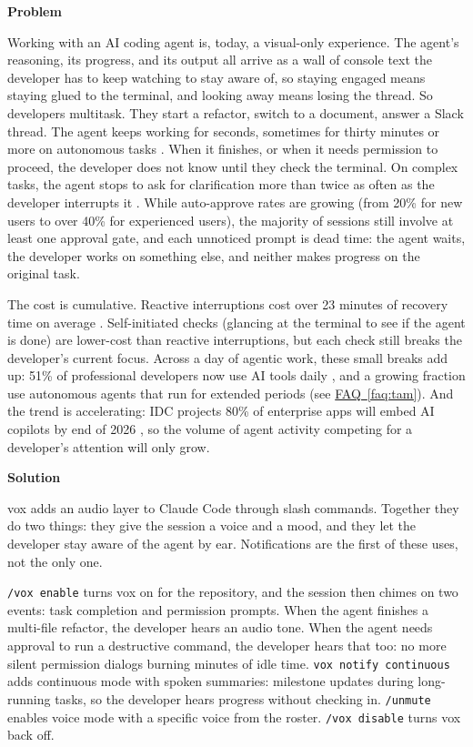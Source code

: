 \documentclass[11pt,letterpaper]{article}
\newcommand{\prsection}[1]{%
  \vspace{1em}%
  {\large\bfseries\color{SectionBlue}#1}%
  \vspace{0.3em}\par%
}
\newcommand{\faqref}[1]{\hyperref[#1]{FAQ~\ref*{#1}}}
\begin{document}
\prsection{Problem}

Working with an AI coding agent is, today, a visual-only experience. The
agent's reasoning, its progress, and its output all arrive as a wall of console
text the developer has to keep watching to stay aware of, so staying engaged
means staying glued to the terminal, and looking away means losing the thread.
So developers multitask. They start a refactor, switch to a document, answer a
Slack thread. The agent keeps working for seconds, sometimes for thirty
minutes or more on autonomous tasks \cite{anthropic2026agentautonomy,anthropic2026longrunnagents}. When it finishes, or when it needs
permission to proceed, the developer does not know until they check the
terminal. On complex tasks, the agent stops to ask for clarification more than
twice as often as the developer interrupts it
\cite{anthropic2026agentautonomy}. While auto-approve rates are growing
(from 20\% for new users to over 40\% for experienced users), the majority
of sessions still involve at least one approval gate, and each unnoticed
prompt is dead time: the agent waits, the developer works on something else,
and neither makes progress on the original task.

The cost is cumulative. Reactive interruptions cost over 23 minutes of
recovery time on average \cite{mark2008interrupted}. Self-initiated checks
(glancing at the terminal to see if the agent is done) are lower-cost
than reactive interruptions, but each check still breaks the developer's
current focus. Across a day of agentic work, these small breaks add up:
51\% of professional developers now use AI tools daily
\cite{stackoverflow2025survey}, and a growing fraction use autonomous agents
that run for extended periods
(see \faqref{faq:tam}). And the trend is accelerating: IDC projects 80\% of
enterprise apps will embed AI copilots by end of 2026
\cite{couriernotificationfatigue2026}, so the volume of agent activity
competing for a developer's attention will only grow.

\prsection{Solution}

vox adds an audio layer to Claude Code through slash commands. Together
they do two things: they give the session a voice and a mood, and they let the
developer stay aware of the agent by ear. Notifications are the first of these
uses, not the only one.

\texttt{/vox enable} turns vox on for the repository, and the session then chimes
on two events: task completion and permission prompts. When the agent finishes
a multi-file refactor, the developer hears an audio tone. When the agent needs
approval to run a destructive command, the developer hears that too: no more
silent permission dialogs burning minutes of idle time. \texttt{vox notify
continuous} adds continuous mode with spoken summaries: milestone updates
during long-running tasks, so the developer hears progress without checking in.
\texttt{/unmute} enables voice mode with a specific voice from the roster.
\texttt{/vox disable} turns vox back off.
\end{document}

